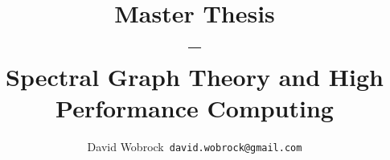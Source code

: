 \documentclass[]{report}
\title{Master Thesis \\ -- \\ Spectral Graph Theory and High Performance Computing}
\author{David Wobrock\ \texttt{david.wobrock@gmail.com}}
\begin{document}
\begin{titlepage}
 \maketitle
\end{titlepage}

\tableofcontents
\newpage









\clearpage
\printbibliography
\end{document}
